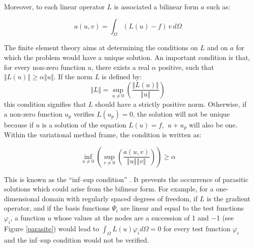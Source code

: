 Moreover, to each linear operator $L$ is associated a bilinear form $a$ such as:%

\begin{equation}
a(u,v)=\int_{\Omega}(L(u)-f)\,v\,d\Omega
\end{equation}


The finite element theory aims at determining the conditions on $L$ and on $a
$ for which the problem would have a unique solution. An important condition
is that, for every non-zero function $u$, there exists a real $\alpha$
positive, such that $\left\Vert L(u)\right\Vert \geq\alpha\left\Vert
u\right\Vert $. If the norm $L$ is defined by:
\[
\left\Vert L\right\Vert =\sup_{u\neq0}\left(  \frac{\left\Vert L(u)\right\Vert
}{\left\Vert u\right\Vert }\right)
\]
this condition signifies that $L$ should have a strictly positive norm.
Otherwise, if a non-zero function $u_{p}$ verifies $L(u_{p})=0$, the solution
will not be unique because if $u$ is a solution of the equation $L(u)=f$,
$\ u+u_{p}$ will also be one. Within the variational method frame, the
condition is written as:%

\begin{equation}
\inf_{u\neq0}\left(  \sup_{v\neq0}\left(  \frac{a(u,v)}{\left\Vert
u\right\Vert \left\Vert v\right\Vert }\right)  \right)  \geq\alpha
\end{equation}


This is known as the \textquotedblleft inf--sup condition\textquotedblright%
%
. It prevents the occurrence of parasitic solutions which could arise from the
bilinear form. For example, for a one-dimensional domain with regularly spaced
degrees of freedom, if $L$ is the gradient operator, and if the basis
functions $\Psi_{i}$ are linear and equal to the test functions $\varphi_{i}$,
a function $u$ whose values at the nodes are a succession of 1 and $-$1 (see
Figure \ref{parasite}) would lead to $\int\nolimits_{\Omega}L(u)\varphi
_{i}d\Omega=0$ for every test function $\varphi_{i}$ and the inf--sup
condition would not be verified.%

